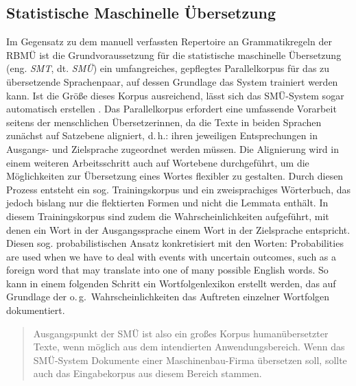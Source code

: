 \subsection{Statistische Maschinelle Übersetzung}

\label{subsecSMT}



Im Gegensatz zu dem manuell verfassten Repertoire an Grammatikregeln der RBMÜ ist die Grundvoraussetzung für die statistische maschinelle Übersetzung (eng. \emph{SMT}, dt. \emph{SMÜ}) ein umfangreiches, gepflegtes Parallelkorpus für das zu übersetzende Sprachenpaar, auf dessen Grundlage das System trainiert werden kann.  Ist die Größe dieses Korpus ausreichend, lässt sich das SMÜ-System sogar automatisch erstellen \citep[647]{carstensen_computerlinguistik_2010}. Das Parallelkorpus erfordert eine umfassende Vorarbeit seitens der menschlichen Übersetzer{\textperiodcentered}innen, da die Texte in beiden Sprachen zunächst auf Satzebene aligniert, d.\,h.: ihren jeweiligen Entsprechungen in Ausgangs- und Zielsprache zugeordnet werden müssen. Die Alignierung wird in einem weiteren Arbeitsschritt auch auf Wortebene durchgeführt, um die Möglichkeiten zur Übersetzung eines Wortes flexibler zu gestalten. Durch diesen Prozess entsteht ein sog. Trainingskorpus und ein zweisprachiges Wörterbuch, das jedoch bislang nur die flektierten Formen und nicht die Lemmata enthält. In diesem Trainingskorpus sind zudem die Wahrscheinlichkeiten aufgeführt, mit denen ein Wort in der Ausgangssprache einem Wort in der Zielsprache entspricht. Diesen sog. probabilistischen Ansatz konkretisiert \citet[6]{koehn_statistical_2009} mit den Worten: \glqq Probabilities are used when we have to deal with events with uncertain outcomes, such as a foreign word that may translate into one of many possible English words.\grqq{} So kann in einem folgenden Schritt ein Wortfolgenlexikon erstellt werden, das auf Grundlage der o.\,g.\ Wahrscheinlichkeiten das Auftreten einzelner Wortfolgen dokumentiert.


\begin{quote}\sloppy
Ausgangspunkt der SMÜ ist also ein großes Korpus humanübersetzter Texte, wenn möglich aus dem intendierten Anwendungsbereich. Wenn das SMÜ-System Dokumente einer Maschinenbau-Firma übersetzen soll, sollte auch das Eingabekorpus aus diesem Bereich stammen. \citep[648]{carstensen_computerlinguistik_2010}
\end{quote}


